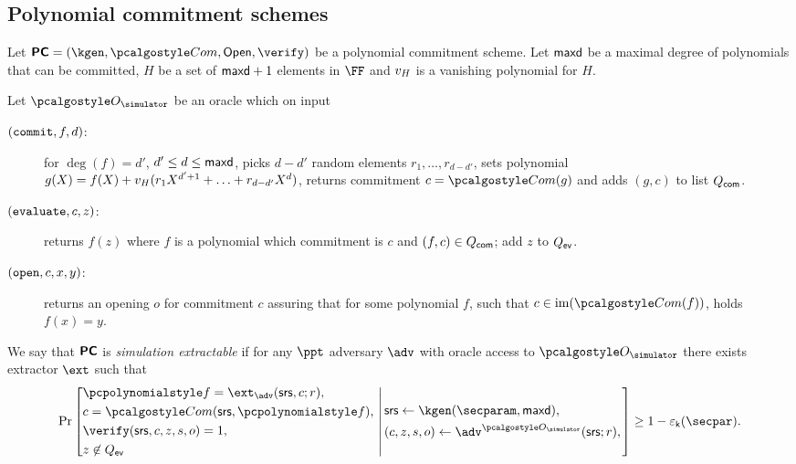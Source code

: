 \documentclass[runningheads,11pt]{llncs}
\begin{document}
\subsection{Polynomial commitment schemes}
\begin{definition}
  \label{def:sepcom}
  Let $\PCOM = (\kgen, \com, \open, \verify)$ be a polynomial commitment
  scheme. Let $\mathsf{maxd}$ be a maximal degree of polynomials that can be
  committed, $H$ be a set of $\mathsf{maxd} + 1$ elements in $\FF$ and
  $v_{H}$ is a vanishing polynomial for $H$.
  
  Let $\oracles$ be an oracle which on input
  \begin{description}
\item[$(\mathtt{commit}, f, d)$:] for $\deg(f) = d'$, $d' \leq d \leq \mathsf{maxd}$,
  picks $d - d'$ random elements $r_1, \ldots, r_{d - d'}$, sets 
  polynomial $g(X) = f(X) + v_{H}(r_1 X^{d' + 1} + \ldots + r_{d - d'} X^{d})$, returns
  commitment $c = \com(g)$ and adds $(g, c)$ to list $Q_{\mathsf{com}}$.
  \item[$(\mathtt{evaluate}, c, z)$:] returns $f(z)$ where $f$ is a polynomial
    which commitment is $c$ and $(f, c) \in Q_{\mathsf{com}}$; add $z$ to $Q_{\mathsf{ev}}$.
  \item[$(\mathtt{open}, c, x, y)$:] returns an opening $o$ for commitment $c$
    assuring that for some polynomial $f$, such that $c \in \image(\com(f))$,
    holds $f(x) = y$.
  \end{description}
  We say that $\bm{\mathsf{PC}}$ is \emph{simulation extractable} if for any $\ppt$
  adversary $\adv$ with oracle access to $\oracles$ there exists extractor
  $\ext$ such that
\[
  \Pr \left[
    \begin{aligned}
      & \p{f} = \ext_\adv(\srs, c; r),\\
      & c = \com(\srs, \p{f}),\\
      & \verify(\srs, c, z, s, o) = 1,\\
      & z \not\in \Qev
    \end{aligned}
    \,\left|\,
      \vphantom{
        \begin{aligned}
          & \\
          & \\
          & \\
          &
        \end{aligned}
        }
    \begin{aligned}
      & \srs \gets \kgen(\secparam, \maxdeg),\\
      & (c, z, s, o) \gets \adv^{\oracles}(\srs; r), \\
    \end{aligned}
  \right.\right]
  \geq 1 - \epsk(\secpar).
\]
\end{definition}
\end{document}
